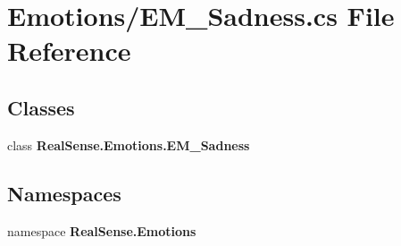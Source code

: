 \section{Emotions/\+E\+M\+\_\+\+Sadness.cs File Reference}
\label{_e_m___sadness_8cs}
\subsection*{Classes}
\begin{DoxyCompactItemize}
\item 
class \textbf{ Real\+Sense.\+Emotions.\+E\+M\+\_\+\+Sadness}
\end{DoxyCompactItemize}
\subsection*{Namespaces}
\begin{DoxyCompactItemize}
\item 
namespace \textbf{ Real\+Sense.\+Emotions}
\end{DoxyCompactItemize}
